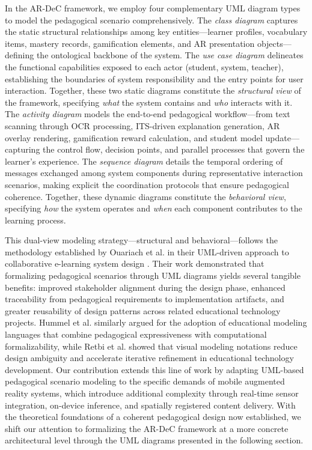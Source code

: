 In the AR-DeC framework, we employ four complementary UML diagram types to model the pedagogical scenario comprehensively. The \textit{class diagram} captures the static structural relationships among key entities---learner profiles, vocabulary items, mastery records, gamification elements, and AR presentation objects---defining the ontological backbone of the system. The \textit{use case diagram} delineates the functional capabilities exposed to each actor (student, system, teacher), establishing the boundaries of system responsibility and the entry points for user interaction. Together, these two static diagrams constitute the \textit{structural view} of the framework, specifying \textit{what} the system contains and \textit{who} interacts with it. The \textit{activity diagram} models the end-to-end pedagogical workflow---from text scanning through OCR processing, ITS-driven explanation generation, AR overlay rendering, gamification reward calculation, and student model update---capturing the control flow, decision points, and parallel processes that govern the learner's experience. The \textit{sequence diagram} details the temporal ordering of messages exchanged among system components during representative interaction scenarios, making explicit the coordination protocols that ensure pedagogical coherence. Together, these dynamic diagrams constitute the \textit{behavioral view}, specifying \textit{how} the system operates and \textit{when} each component contributes to the learning process.

This dual-view modeling strategy---structural and behavioral---follows the methodology established by Ouariach et al. in their UML-driven approach to collaborative e-learning system design \cite{Ouariach2023, Ouariach2025, Ouariach2026}. Their work demonstrated that formalizing pedagogical scenarios through UML diagrams yields several tangible benefits: improved stakeholder alignment during the design phase, enhanced traceability from pedagogical requirements to implementation artifacts, and greater reusability of design patterns across related educational technology projects. Hummel et al. \cite{Hummel2004} similarly argued for the adoption of educational modeling languages that combine pedagogical expressiveness with computational formalizability, while Retbi et al. \cite{Retbi2012} showed that visual modeling notations reduce design ambiguity and accelerate iterative refinement in educational technology development. Our contribution extends this line of work by adapting UML-based pedagogical scenario modeling to the specific demands of mobile augmented reality systems, which introduce additional complexity through real-time sensor integration, on-device inference, and spatially registered content delivery. With the theoretical foundations of a coherent pedagogical design now established, we shift our attention to formalizing the AR-DeC framework at a more concrete architectural level through the UML diagrams presented in the following section.
